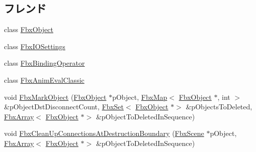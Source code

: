 \subsection*{フレンド}
\begin{DoxyCompactItemize}
\item 
class \hyperlink{class_fbx_property_a7ea6fa004b54d9c3cd5b85fd33328078}{Fbx\+Object}
\item 
class \hyperlink{class_fbx_property_a9e1f446d3bd16145e2b59d431856e5e0}{Fbx\+I\+O\+Settings}
\item 
class \hyperlink{class_fbx_property_a8d8dceef68317bda5a5d5404edfab5da}{Fbx\+Binding\+Operator}
\item 
class \hyperlink{class_fbx_property_a1b769b6684b71dfe76f350fef1137cab}{Fbx\+Anim\+Eval\+Classic}
\item 
void \hyperlink{class_fbx_property_a08fc1df47ff71ef2c17871f8e95ab2d6}{Fbx\+Mark\+Object} (\hyperlink{class_fbx_object}{Fbx\+Object} $\ast$p\+Object, \hyperlink{class_fbx_map}{Fbx\+Map}$<$ \hyperlink{class_fbx_object}{Fbx\+Object} $\ast$, int $>$ \&p\+Object\+Dst\+Disconnect\+Count, \hyperlink{class_fbx_set}{Fbx\+Set}$<$ \hyperlink{class_fbx_object}{Fbx\+Object} $\ast$$>$ \&p\+Objects\+To\+Deleted, \hyperlink{class_fbx_array}{Fbx\+Array}$<$ \hyperlink{class_fbx_object}{Fbx\+Object} $\ast$$>$ \&p\+Object\+To\+Deleted\+In\+Sequence)
\item 
void \hyperlink{class_fbx_property_ae1a9835e0187d6623df42de2bde8c29d}{Fbx\+Clean\+Up\+Connections\+At\+Destruction\+Boundary} (\hyperlink{class_fbx_scene}{Fbx\+Scene} $\ast$p\+Object, \hyperlink{class_fbx_array}{Fbx\+Array}$<$ \hyperlink{class_fbx_object}{Fbx\+Object} $\ast$$>$ \&p\+Object\+To\+Deleted\+In\+Sequence)
\end{DoxyCompactItemize}
